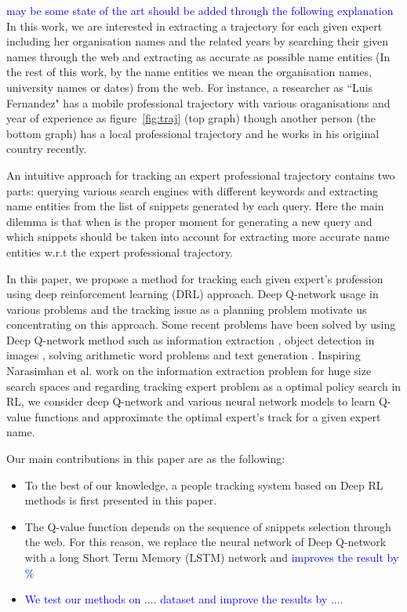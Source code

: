 \documentclass[11pt,a4paper]{article}
\newcommand{\PA}[1]{{\textcolor{blue}{#1}}}
\begin{document}
\PA{may be some state of the art should be added through the following explanation}\\
In this work, we are interested in extracting a trajectory for each given expert including her organisation names and the related years by searching their given names through the web and extracting as accurate as possible name entities (In the rest of this work, by the name entities we mean the organisation names, university names or dates) from the web.  For instance, a researcher as ``Luis Fernandez" has a mobile professional trajectory with various oraganisations and year of experience as figure~\ref{fig:traj} (top graph) though another person (the bottom graph) has a local professional trajectory and he works in his original country recently.  

An intuitive approach for tracking an expert professional trajectory contains two parts: querying various search engines with different keywords and extracting name entities from the list of snippets generated by each query. Here the main dilemma is that when is the proper moment for generating a new query and which snippets should be taken into account for extracting more accurate name entities w.r.t the expert professional trajectory. %

In this paper, we propose a method for tracking each given expert's profession using deep reinforcement learning (DRL) approach. Deep Q-network usage in various problems and the tracking issue as a planning problem motivate us concentrating on this approach. Some recent problems have been solved by using Deep Q-network method such as information extraction \citep{narasimhan2016improving}, object detection in images \cite{Caicedo2015}, solving arithmetic word problems \cite{wang2018} and text generation \citep{Guo2015}. Inspiring Narasimhan et al.  work on the information extraction problem for huge size search spaces and regarding tracking expert problem as a optimal policy search in RL, we consider deep Q-network and various neural network models to learn Q-value functions and approximate the optimal expert's track for a given expert name.  

Our main contributions in this paper are as the following:
\begin{itemize}
\item To the best of our knowledge, a people tracking system based on Deep RL methods is first presented in this paper.
\item The Q-value function depends on the sequence of snippets selection through the web. For this reason, we replace the neural network of Deep Q-network \cite{mnih2015} with a long Short Term Memory (LSTM) network and \PA{improves the result by \%  }
\item \PA{We test our methods on .... dataset and improve the results by .... }
\end{itemize}
\end{document}
